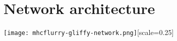 
\section{Network architecture}

\graphicspath{ {images/} } 
\texttt{[image: mhcflurry-gliffy-network.png]}[scale=0.25]
